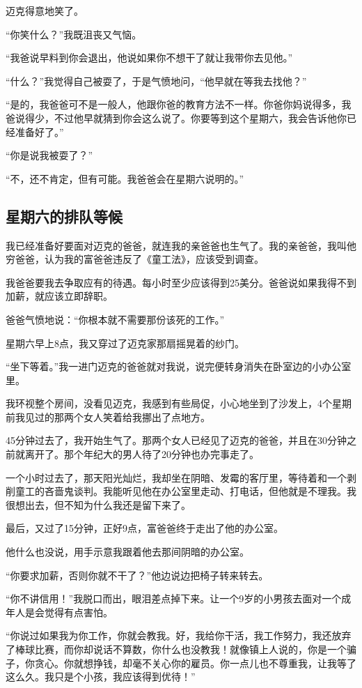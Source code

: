 迈克得意地笑了。

“你笑什么？”我既沮丧又气恼。

“我爸说早料到你会退出，他说如果你不想干了就让我带你去见他。”

“什么？”我觉得自己被耍了，于是气愤地问，“他早就在等我去找他？”

“是的，我爸爸可不是一般人，他跟你爸的教育方法不一样。你爸你妈说得多，我爸说得少，不过他早就猜到你会这么说了。你要等到这个星期六，我会告诉他你已经准备好了。”

“你是说我被耍了？”

“不，还不肯定，但有可能。我爸爸会在星期六说明的。”

\subsection*{星期六的排队等候}
我已经准备好要面对迈克的爸爸，就连我的亲爸爸也生气了。我的亲爸爸，我叫他穷爸爸，认为我的富爸爸违反了《童工法》，应该受到调查。

我爸爸要我去争取应有的待遇。每小时至少应该得到25美分。爸爸说如果我得不到加薪，就应该立即辞职。

爸爸气愤地说：“你根本就不需要那份该死的工作。”

星期六早上8点，我又穿过了迈克家那扇摇晃着的纱门。

“坐下等着。”我一进门迈克的爸爸就对我说，说完便转身消失在卧室边的小办公室里。

我环视整个房间，没看见迈克，我感到有些局促，小心地坐到了沙发上，4个星期前我见过的那两个女人笑着给我挪出了点地方。

45分钟过去了，我开始生气了。那两个女人已经见了迈克的爸爸，并且在30分钟之前就离开了。那个年纪大的男人待了20分钟也办完事走了。

一个小时过去了，那天阳光灿烂，我却坐在阴暗、发霉的客厅里，等待着和一个剥削童工的吝啬鬼谈判。我能听见他在办公室里走动、打电话，但他就是不理我。我很想出去，但不知为什么我还是留下来了。

最后，又过了15分钟，正好9点，富爸爸终于走出了他的办公室。

他什么也没说，用手示意我跟着他去那间阴暗的办公室。

“你要求加薪，否则你就不干了？”他边说边把椅子转来转去。

“你不讲信用！”我脱口而出，眼泪差点掉下来。让一个9岁的小男孩去面对一个成年人是会觉得有点害怕。

“你说过如果我为你工作，你就会教我。好，我给你干活，我工作努力，我还放弃了棒球比赛，而你却说话不算数，你什么也没教我！就像镇上人说的，你是一个骗子，你贪心。你就想挣钱，却毫不关心你的雇员。你一点儿也不尊重我，让我等了这么久。我只是个小孩，我应该得到优待！”

